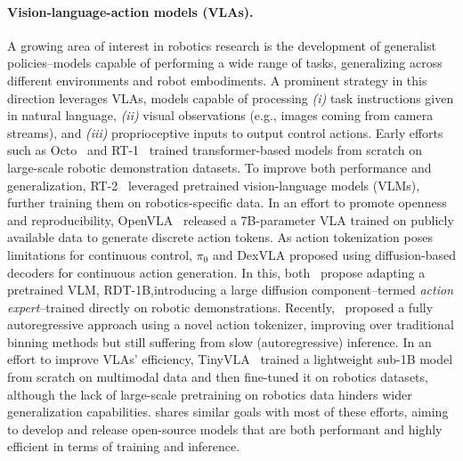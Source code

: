 \paragraph{Vision-language-action models (VLAs).} A growing area of interest in robotics research is the development of generalist policies--models capable of performing a wide range of tasks, generalizing across different environments and robot embodiments. 
A prominent strategy in this direction leverages VLAs, models capable of processing \emph{(i)} task instructions given in natural language, \emph{(ii)} visual observations (e.g., images coming from camera streams), and \emph{(iii)} proprioceptive inputs to output control actions.
Early efforts such as Octo~\citep{team2024octo} and RT-1~\citep{o2024openrtx} trained transformer-based models from scratch on large-scale robotic demonstration datasets. To improve both performance and generalization, RT-2~\citep{brohan2023rt2} leveraged pretrained vision-language models (VLMs), further training them on robotics-specific data. 
In an effort to promote openness and reproducibility, OpenVLA~\citep{kimopenvla} released a 7B-parameter VLA trained on publicly available data to generate discrete action tokens. 
As action tokenization poses limitations for continuous control, \( \pi_0 \) \citep{black2024pi_0} and DexVLA \citep{wen2025dexvla} proposed using diffusion-based decoders for continuous action generation. 
In this, both~\citet{black2024pi_0, wen2025dexvla} propose adapting a pretrained VLM, RDT-1B,introducing a large diffusion component--termed \emph{action expert}--trained directly on robotic demonstrations. 
Recently,~\cite{pertsch2025fast} proposed a fully autoregressive approach using a novel action tokenizer, improving over traditional binning methods but still suffering from slow (autoregressive) inference. 
In an effort to improve VLAs' efficiency, TinyVLA~\citep{wen2024tinyvla} trained a lightweight sub-1B model from scratch on multimodal data and then fine-tuned it on robotics datasets, although the lack of large-scale pretraining on robotics data hinders wider generalization capabilities. 
\ours shares similar goals with most of these efforts, aiming to develop and release open-source models that are both performant and highly efficient in terms of training and inference.



